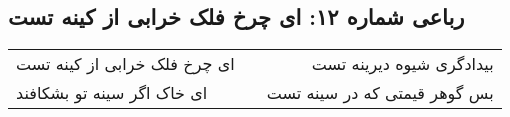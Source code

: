 \begin{center}
\section*{رباعی شماره ۱۲: ای چرخ فلک خرابی از کینه تست}
\label{sec:sh012}
\begin{longtable}{l p{0.5cm} r}
ای چرخ فلک خرابی از کینه تست
&&
بیدادگری شیوه دیرینه تست
\\
ای خاک اگر سینه تو بشکافند
&&
بس گوهر قیمتی که در سینه تست
\\
\end{longtable}
\end{center}
